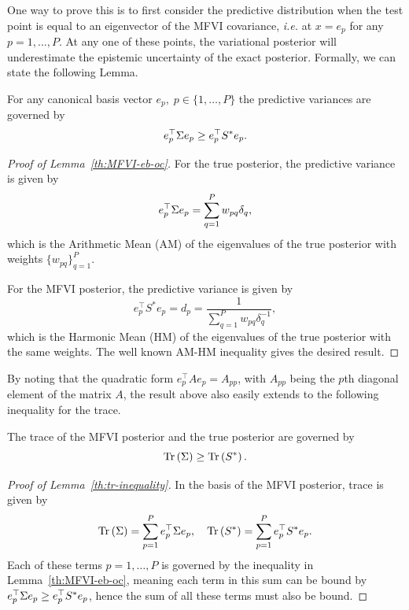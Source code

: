 One way to prove this is to first  consider the predictive distribution  when the test point is equal to an eigenvector of the MFVI covariance, \textit{i.e.} at $x = e_p$ for any $p=1, \dots,P$. At any one of these points, the variational posterior will underestimate the epistemic uncertainty of the exact posterior. Formally, we can state the following Lemma.
\begin{lemma}\label{th:MFVI-eb-oc} For any canonical basis vector $e_p, \; p \in \{1, \dots, P\}$ the predictive variances are governed by 
    \begin{equation}
        e_p^\top \Sigma e_p  \geq e_p^\top S^* e_p. 
    \end{equation}
\end{lemma}
\begin{proof}[Proof of Lemma~\ref{th:MFVI-eb-oc}]
For the true posterior, the predictive variance is given by
    \begin{equation}
        e_p^\top  \Sigma e_p = \sum_{q=1}^P w_{pq} \delta_q,
    \end{equation}
which is the Arithmetic Mean (AM) of the eigenvalues of the true posterior with weights $\{w_{pq}\}_{q=1}^P$. 

For the MFVI posterior, the predictive variance is given by 
    \begin{equation}
        e_p^\top  S^* e_p = d_p = \frac{1}{\sum_{q=1}^P w_{pq} \delta_{q}^{-1}},
    \end{equation}
which is the Harmonic Mean (HM) of the eigenvalues of the true posterior with the same weights. The well known AM-HM inequality gives the desired result. 
\end{proof}


By noting that the quadratic form $e_p^\top A e_p = A_{pp}$, with $A_{pp}$ being the $p$th diagonal element of the matrix $A$, the result above also easily extends to the following inequality for the trace.

\begin{lemma}  \label{th:tr-inequality}
The trace of the MFVI posterior and the true posterior are governed by
\begin{equation}
    \text{Tr}\left(\Sigma\right) \geq \text{Tr}\left(S^*\right).
\end{equation}
\end{lemma}
\begin{proof}[Proof of Lemma~\ref{th:tr-inequality}]
In the basis of the MFVI posterior, trace is given by 
\begin{equation}
    \text{Tr}\left(\Sigma\right) = \sum_{p=1}^P e_p^\top  \Sigma e_p, \quad \text{Tr}\left(S^*\right) = \sum_{p=1}^P e_p^\top  S^* e_p. 
\end{equation}
Each of these terms $p=1,\dots,P$ is governed by the inequality in Lemma~\ref{th:MFVI-eb-oc}, meaning each term in this sum can be bound by $e_p^\top  \Sigma e_p  \geq e_p^\top  S^* e_p$, hence the sum of all these terms must also be bound. 
\end{proof}

